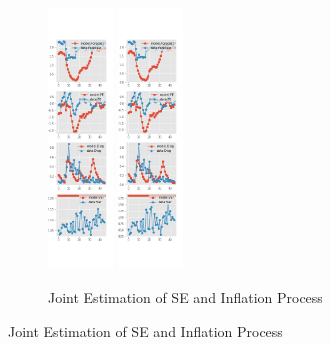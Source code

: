\documentclass[]{article}
\begin{document}
\begin{figure}[ht]
\begin{subfigure}[b]{\textwidth}
		\includegraphics[width=0.19\textwidth]{figures/spf_se_est_diag3.png}
		\includegraphics[width=0.19\textwidth]{figures/spf_se_est_diag4.png}
	\end{subfigure}
	\vspace{1em}
	\vfill
	\begin{subfigure}[b]{\textwidth}
		\centering
		\caption{Joint Estimation of SE and Inflation Process}
		\label{SE_diag_joint_SPF}

\end{subfigure}
\end{figure}
\end{document}
